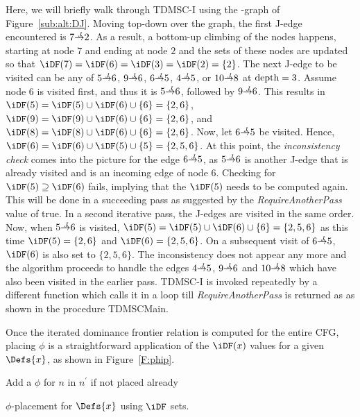 {%
Here, we will briefly walk through TDMSC-I using the \DJ-graph of 
Figure~\ref{sub:alt:DJ}.  Moving top-down over the graph, the first J-edge 
encountered is $7 \st{J} 2$.  As a result, a bottom-up climbing of the nodes 
happens, starting at node $7$ and ending at node $2$ and the \iDF sets of these 
nodes are updated so that $\iDF(7) = \iDF(6) = \iDF(3) = \iDF(2) = \{2\}$.  The 
next J-edge to be visited can be any of $5 \st{J} 6$, $9 \st{J} 6$, $6 \st{J} 
5$, $4 \st{J} 5$, or $10 \st{J} 8$ at $\textrm{depth} = 3$.  Assume node 
6 is visited first, and thus it is $5 \st{J} 6$, followed by  $9 \st{J} 6$.
This results in $\iDF(5) = \iDF(5) \cup \iDF(6) \cup \{6\} = \{2,6\}$, $\iDF(9) = \iDF(9) \cup \iDF(6) \cup \{6\} = \{2,6\}$, and $\iDF(8) = \iDF(8) \cup \iDF(6) \cup \{6\} = \{2,6\}$.
Now, let $6 \st{J} 5$ be visited. 
Hence, $\iDF(6) = \iDF(6) \cup \iDF(5) \cup \{5\} = \{2,5,6\}$. 
At this point, the \emph{inconsistency check} comes into the picture for the edge $6 \st{J} 5$, as $5 \st{J} 6$ is another J-edge that is already visited and is an incoming edge of node $6$. 
Checking for $\iDF(5) \supseteq \iDF(6)$ fails, implying that the $\iDF(5)$ needs to be computed again. 
This will be done in a succeeding pass as suggested by the \textit{RequireAnotherPass} value of true. 
In a second iterative pass, the J-edges are visited in the same order. 
Now, when $5 \st{J} 6$ is visited, $\iDF(5) = \iDF(5) \cup \iDF(6) \cup \{6\} = \{2,5,6\}$ as this time $\iDF(5) = \{2,6\}$ and $\iDF(6) = \{2,5,6\}$. 
On a subsequent visit of $6 \st{J} 5$, $\iDF(6)$ is also set to $\{2,5,6\}$. 
The inconsistency does not appear any more and the algorithm proceeds to handle the edges $4 \st{J} 5$, $9 \st{J} 6$ and $10 \st{J} 8$ which have also been visited in the earlier pass. 
TDMSC-I is invoked repeatedly by a different function which calls it in a loop till \textit{RequireAnotherPass} is returned as \false as shown in the procedure TDMSCMain.

Once the iterated dominance frontier relation is computed for the entire CFG, placing $\phi$ is a straightforward application of the $\iDF(x)$ values for a given $\Defs{x}$, as shown in Figure~\ref{F:phip}.


\begin{algorithm}
   {
     {
      Add a $\phi$ for $n$ in $n^{'}$ if not placed already
    }
  }
  \caption{$\phi$-placement for $\Defs{x}$ using $\iDF$ sets.}
  \label{proc:phi-placement}


\end{algorithm}}
